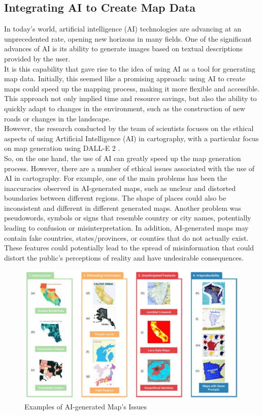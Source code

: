 \documentclass[10pt,oneside,english,a4paper]{article}
\begin{document}
\subsection{Integrating AI to Create Map Data} \label{future:ai}
In today's world, artificial intelligence (AI) technologies are advancing at an unprecedented rate, opening new horizons in many fields. One of the significant advances of AI is its ability to generate images based on textual descriptions provided by the user.
\\It is this capability that gave rise to the idea of using AI as a tool for generating map data. Initially, this seemed like a promising approach: using AI to create maps could speed up the mapping process, making it more flexible and accessible. This approach not only implied time and resource savings, but also the ability to quickly adapt to changes in the environment, such as the construction of new roads or changes in the landscape.
\\However, the research conducted by the team of scientists focuses on the ethical aspects of using Artificial Intelligence (AI) in cartography, with a particular focus on map generation using DALL-E 2 \cite{Kang2023}. 
\\So, on the one hand, the use of AI can greatly speed up the map generation process. However, there are a number of ethical issues associated with the use of AI in cartography. For example, one of the main problems has been the inaccuracies observed in AI-generated maps, such as unclear and distorted boundaries between different regions. The shape of places could also be inconsistent and different in different generated maps. Another problem was pseudowords, symbols or signs that resemble country or city names, potentially leading to confusion or misinterpretation. In addition, AI-generated maps may contain fake countries, states/provinces, or counties that do not actually exist. These features could potentially lead to the spread of misinformation that could distort the public's perceptions of reality and have undesirable consequences.

\begin{figure}[h]
	\centering
	\includegraphics[scale = 0.6]{diagram8.jpg}
	\caption{Examples of AI-generated Map's Issues}
	\label{fig:ai}
\end{figure}
\end{document}
